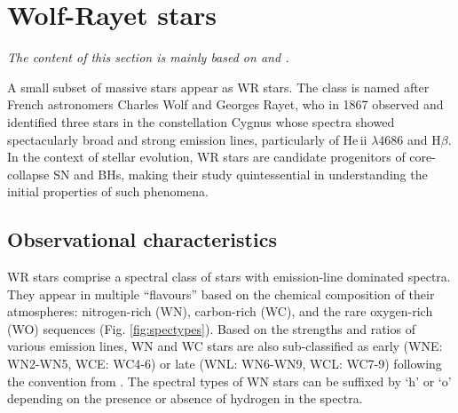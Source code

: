 

\section{Wolf-Rayet stars}\label{sect:wr_intro}

\textit{The content of this section is mainly based on \citet{crowther_physical_2007} and \citet{langer_presupernova_2012}.}

A small subset of massive stars appear as WR stars. The class is named after French astronomers Charles Wolf and Georges Rayet, who in 1867 observed and identified three stars in the constellation Cygnus whose spectra showed spectacularly broad and strong emission lines, particularly of He\,{\sc ii} $\lambda 4686$ and H$\beta$. In the context of stellar evolution, WR stars are candidate progenitors of core-collapse SN and BHs, making their study quintessential in understanding the initial properties of such phenomena.

\subsection{Observational characteristics}\label{sect:wr_obs_char}

WR stars comprise a spectral class of stars with emission-line dominated spectra. They appear in multiple ``flavours'' based on the chemical composition of their atmospheres: nitrogen-rich (WN), carbon-rich (WC), and the rare oxygen-rich (WO) sequences (Fig. \ref{fig:spectypes}). Based on the strengths and ratios of various emission lines, WN and WC stars are also sub-classified as early (WNE: WN2-WN5, WCE: WC4-6) or late (WNL: WN6-WN9, WCL: WC7-9) following the convention from \citet{smith_revised_1968}. The spectral types of WN stars can be suffixed by `h' or `o' depending on the presence or absence of hydrogen in the spectra.

